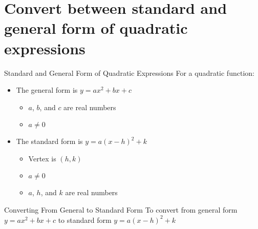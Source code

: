 \documentclass[t,usenames,dvipsnames]{beamer}
\begin{document}
\section{Convert between standard and general form of quadratic expressions}

\begin{frame}{Standard and General Form of Quadratic Expressions}
For a quadratic function: \newline\\  
\begin{itemize}
    \item<+-> The \alert{general form} is $y = ax^2+bx+c$
    \begin{itemize}
        \item<+-> $a$, $b$, and $c$ are real numbers
        \item<+-> $a \neq 0$    
    \end{itemize}   \vspace{8pt}
    \item<+-> The \alert{standard form} is $y = a(x-h)^2 + k$
    \begin{itemize}
        \item<+-> Vertex is $(h,k)$
        \item<+-> $a \neq 0$
        \item<+-> $a$, $h$, and $k$ are real numbers
    \end{itemize}
\end{itemize}
\end{frame}

\begin{frame}{Converting From General to Standard Form}
    To convert from general form $y = ax^2 + bx + c$ to standard form $y = a(x-h)^2+k$ \newline\\
    \begin{enumerate}
          \\[8pt]
        \begin{itemize}
             \\[8pt]
             \\[8pt]
             \\[8pt]
        \end{itemize}
    \end{enumerate}
\end{frame}
\end{document}
